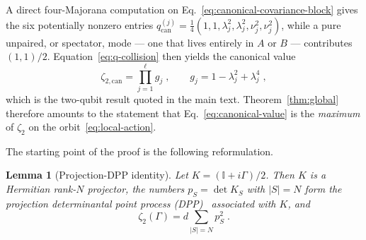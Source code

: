 \documentclass[prx,twocolumn,superscriptaddress,aps,10pt, frontmatterverbose, reprint,footinbib,longbibliography=true]{revtex4-2}
\newtheorem{lemma}{Lemma}
\begin{document}
A direct four-Majorana computation on Eq.~\eqref{eq:canonical-covariance-block} gives the six potentially nonzero entries $q^{(j)}_{\mathrm{can}}=\tfrac14(1,1,\lambda_j^2,\lambda_j^2,\nu_j^2,\nu_j^2)$, while a pure unpaired, or spectator, mode --- one that lives entirely in $A$ or $B$ --- contributes $(1,1)/2$. Equation~\eqref{eq:q-collision} then yields the canonical value
\begin{equation}
    \zeta_{2,\mathrm{can}}=\prod_{j=1}^{\ell}g_j\;,\qquad g_j=1-\lambda_j^2+\lambda_j^4\;,
    \label{eq:canonical-value}
\end{equation}
which is the two-qubit result quoted in the main text. Theorem~\ref{thm:global} therefore amounts to the statement that Eq.~\eqref{eq:canonical-value} is the \emph{maximum} of $\zeta_2$ on the orbit~\eqref{eq:local-action}.

The starting point of the proof is the following reformulation.

\begin{lemma}[Projection-DPP identity]
\label{lem:DPP}
Let $K=(\mathbb{I}+i\Gamma)/2$. Then $K$ is a Hermitian rank-$N$ projector, the numbers $p_S=\det K_S$ with $|S|=N$ form the projection determinantal point process (DPP)~\cite{collura2026nonstabilizernessfermionicgaussianstates} associated with $K$, and
\begin{equation}
    \zeta_2(\Gamma)=d\sum_{|S|=N}p_S^2\;.
    \label{eq:DPP-collision}
\end{equation}
\end{lemma}
\end{document}
